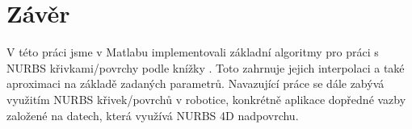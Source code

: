 \section{Závěr}
V této práci jsme v Matlabu implementovali základní algoritmy pro práci s NURBS křivkami/povrchy podle knížky \cite{The_NURBS_Book}. Toto zahrnuje jejich interpolaci a také aproximaci na základě zadaných parametrů. Navazující práce se dále zabývá využitím NURBS křivek/povrchů v robotice, konkrétně aplikace dopředné vazby založené na datech, která využívá NURBS 4D nadpovrchu.
